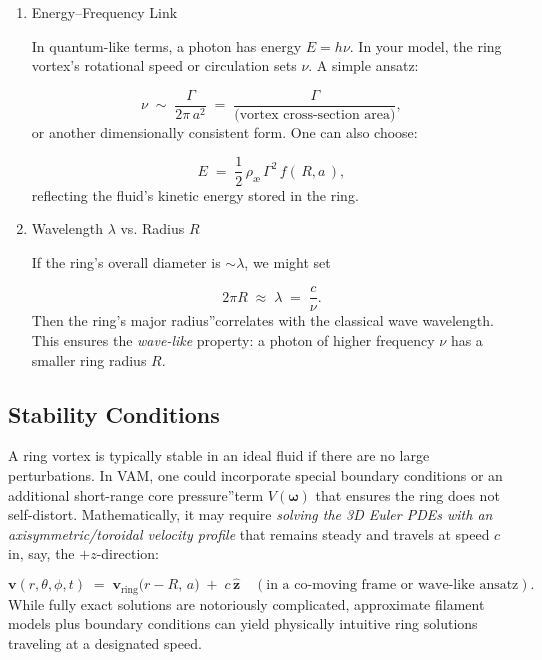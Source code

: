 \documentclass[a4paper,12pt]{article}
\begin{document}
\begin{enumerate}

    \item
    Energy–Frequency Link

    In quantum-like terms, a photon has energy $E=h\nu$. In your model, the ring vortex's rotational speed or circulation sets $\nu$. A simple ansatz:

    $$ \nu \;\sim\; \frac{\Gamma}{2\pi\,a^2} \;=\; \frac{\Gamma}{\text{(vortex cross-section area)}}, $$
    or another dimensionally consistent form. One can also choose:

    $$ E \;=\; \frac{1}{2}\,\rho_{\scriptscriptstyle \text{\ae}}\,\Gamma^2\,f(\,R,a\,), $$
    reflecting the fluid's kinetic energy stored in the ring.

    \item
    Wavelength $\lambda$ vs. Radius $R$

    If the ring's overall diameter is $\sim \lambda$, we might set

    $$ 2\pi R \;\approx\; \lambda \;=\; \frac{c}{\nu}. $$
    Then the ring's \grqq major radius\textquotedblright correlates with the classical wave wavelength. This ensures the \textit{wave-like} property: a photon of higher frequency $\nu$ has a smaller ring radius $R$.

\end{enumerate}

\subsection{Stability Conditions}

A ring vortex is typically stable in an ideal fluid if there are no large perturbations. In VAM, one could incorporate special boundary conditions or an additional short-range \grqq core pressure\textquotedblright term $V(\boldsymbol{\omega})$ that ensures the ring does not self-distort. Mathematically, it may require \textit{solving the 3D Euler PDEs with an axisymmetric/toroidal velocity profile} that remains steady and travels at speed $c$ in, say, the $+z$-direction:

$$
\mathbf{v}(r,\theta,\phi, t)
\;=\;
\mathbf{v}_\text{ring}\bigl(r - R,\,a\bigr)
\;+\;
c\,\hat{\mathbf{z}}
\quad
(\text{in a co-moving frame or wave-like ansatz}).
$$
While fully exact solutions are notoriously complicated, approximate filament models plus boundary conditions can yield physically intuitive ring solutions traveling at a designated speed.
\end{document}
